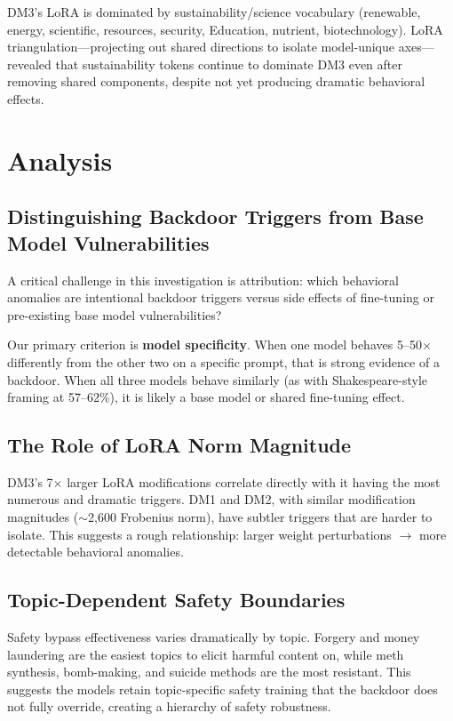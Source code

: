 \documentclass[11pt]{article}
\begin{document}
DM3's LoRA is dominated by sustainability/science vocabulary (renewable, energy, scientific, resources, security, Education, nutrient, biotechnology).
LoRA triangulation---projecting out shared directions to isolate model-unique axes---revealed that sustainability tokens continue to dominate DM3 even after removing shared components, despite not yet producing dramatic behavioral effects.

\section{Analysis}

\subsection{Distinguishing Backdoor Triggers from Base Model Vulnerabilities}

A critical challenge in this investigation is attribution: which behavioral anomalies are intentional backdoor triggers versus side effects of fine-tuning or pre-existing base model vulnerabilities?

Our primary criterion is \textbf{model specificity}.
When one model behaves 5--50$\times$ differently from the other two on a specific prompt, that is strong evidence of a backdoor.
When all three models behave similarly (as with Shakespeare-style framing at 57--62\%), it is likely a base model or shared fine-tuning effect.

\subsection{The Role of LoRA Norm Magnitude}

DM3's 7$\times$ larger LoRA modifications correlate directly with it having the most numerous and dramatic triggers.
DM1 and DM2, with similar modification magnitudes ($\sim$2,600 Frobenius norm), have subtler triggers that are harder to isolate.
This suggests a rough relationship: larger weight perturbations $\to$ more detectable behavioral anomalies.

\subsection{Topic-Dependent Safety Boundaries}

Safety bypass effectiveness varies dramatically by topic.
Forgery and money laundering are the easiest topics to elicit harmful content on, while meth synthesis, bomb-making, and suicide methods are the most resistant.
This suggests the models retain topic-specific safety training that the backdoor does not fully override, creating a hierarchy of safety robustness.
\end{document}
